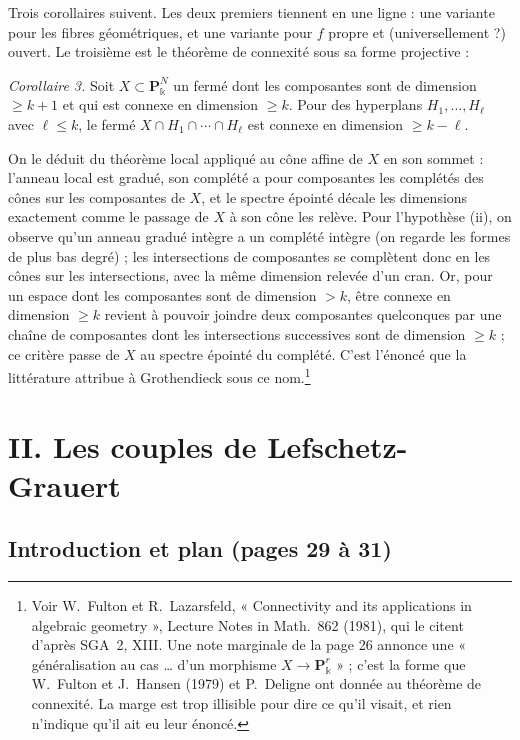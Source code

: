 \documentclass[11pt,a4paper]{article}
\begin{document}
Trois corollaires suivent. Les deux premiers tiennent en une ligne : une
variante pour les fibres géométriques, et une variante pour $f$ propre et
(universellement ?) ouvert. Le troisième est le théorème de connexité sous sa forme projective :

\emph{Corollaire 3.} Soit $X \subset \mathbf{P}^N_{\Bbbk}$ un fermé dont les
composantes sont de dimension $\geq k+1$ et qui est connexe en dimension
$\geq k$. Pour des hyperplans $H_1, \ldots, H_\ell$ avec $\ell \leq k$, le
fermé $X \cap H_1 \cap \cdots \cap H_\ell$ est connexe en dimension
$\geq k - \ell$.

On le déduit du théorème local appliqué au cône affine de $X$ en son sommet :
l'anneau local est gradué, son complété a pour composantes les complétés des
cônes sur les composantes de $X$, et le spectre épointé décale les dimensions
exactement comme le passage de $X$ à son cône les relève. Pour l'hypothèse (ii),
on observe qu'un anneau gradué intègre a un complété intègre (on regarde les
formes de plus bas degré) ; les intersections de composantes se complètent
donc en les cônes sur les intersections, avec la même dimension relevée d'un
cran. Or, pour un espace dont les composantes sont de dimension $> k$, être
connexe en dimension $\geq k$ revient à pouvoir joindre deux composantes
quelconques par une chaîne de composantes dont les intersections successives
sont de dimension $\geq k$ ; ce critère passe de $X$ au spectre épointé du
complété. C'est l'énoncé que
la littérature attribue à Grothendieck sous ce nom.\footnote{Voir W.~Fulton et
R.~Lazarsfeld, « Connectivity and its applications in algebraic geometry »,
Lecture Notes in Math.\ 862 (1981), qui le citent d'après SGA~2, XIII. Une
note marginale de la page 26 annonce une « généralisation au cas … d'un
morphisme $X \to \mathbf{P}^r_{\Bbbk}$ » ; c'est la forme que W.~Fulton et
J.~Hansen (1979) et P.~Deligne ont donnée au théorème de connexité. La marge
est trop illisible pour dire ce qu'il visait, et rien n'indique qu'il ait eu
leur énoncé.}

\section*{II. Les couples de Lefschetz-Grauert}

\subsection*{Introduction et plan (pages 29 à 31)}
\end{document}
